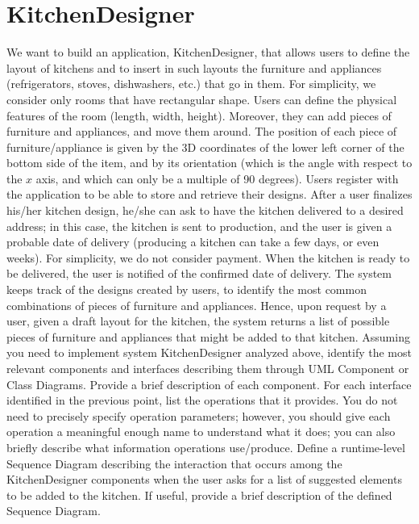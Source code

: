 \section{KitchenDesigner}

We want to build an application, KitchenDesigner, that allows users to define the layout of kitchens and to insert in such layouts the furniture and appliances (refrigerators, stoves, dishwashers, etc.) that go in them.
For simplicity, we consider only rooms that have rectangular shape. 
Users can define the physical features of the room (length, width, height). 
Moreover, they can add pieces of furniture and appliances, and move them around. 
The position of each piece of furniture/appliance is given by the 3D coordinates of the lower left corner of the bottom side of the item, and by its orientation (which is the angle with respect to the $x$ axis, and which can only be a multiple of 90 degrees).
Users register with the application to be able to store and retrieve their designs. 
After a user finalizes his/her kitchen design, he/she can ask to have the kitchen delivered to a desired address; in this case, the kitchen is sent to production, and the user is given a probable date of delivery (producing a kitchen can take a few days, or even weeks). 
For simplicity, we do not consider payment. 
When the kitchen is ready to be delivered, the user is notified of the confirmed date of delivery.
The system keeps track of the designs created by users, to identify the most common combinations of pieces of furniture and appliances. 
Hence, upon request by a user, given a draft layout for the kitchen, the system returns a list of possible pieces of furniture and appliances that might be added to that kitchen.
Assuming you need to implement system KitchenDesigner analyzed above, identify the most relevant components and interfaces describing them through UML Component or Class Diagrams.
Provide a brief description of each component. 
For each interface identified in the previous point, list the operations that it provides. 
You do not need to precisely specify operation parameters; however, you should give each operation a meaningful enough name to understand what it does; you can also briefly describe what information operations use/produce.
Define a runtime-level Sequence Diagram describing the interaction that occurs among the KitchenDesigner components when the user asks for a list of suggested elements to be added to the kitchen. 
If useful, provide a brief description of the defined Sequence Diagram.

